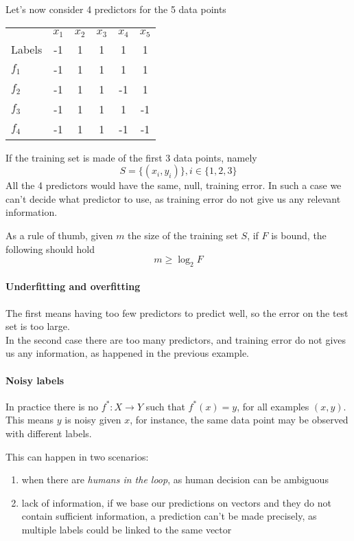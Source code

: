 Let's now consider 4 predictors for the 5 data points
\begin{center}
    \begin{tabular}{l c c c c c}
     & $x_1$ & $x_2$ & $x_3$ & $x_4$ & $x_5$ \\
     Labels & -1 & 1 & 1 & 1 & 1\\
     \hline
    $f_1$ & -1 & 1 & 1 & 1 & 1 \\
    $f_2$ & -1 & 1 & 1 & -1 & 1 \\
    $f_3$ & -1 & 1 & 1 & 1 & -1 \\
    $f_4$ & -1 & 1 & 1 & -1 & -1 \\
    \end{tabular}
\end{center}
If the training set is made of the first 3 data points, namely 
$$S = \{(x_i, y_i)\}, i \in \{1,2,3\}$$
All the 4 predictors would have the same, null, training error.
In such a case we can't decide what predictor to use, as training error do not give 
us any relevant information.

As a rule of thumb, given $m$ the size of the training set $S$, if $F$ is bound, 
the following should hold
$$m \geq \log_2 F$$

\paragraph{Underfitting and overfitting} 
The first means having too few predictors to predict well, 
so the error on the test set is too large.\\
In the second case there are too many predictors, and training error do 
not gives us any information, as happened in the previous example. 

\paragraph{Noisy labels}
In practice there is no $f^* : X \rightarrow Y$ such that $f^*(x) = y$, 
for all examples $(x,y)$. This means $y$ is noisy given $x$, for instance, 
the same data point may be observed with different labels.

This can happen in two scenarios:
\begin{enumerate}
    \item when there are \emph{humans in the loop}, as human decision 
    can be ambiguous
    \item lack of information, if we base our predictions on vectors and 
    they do not contain sufficient information, a prediction can't be made 
    precisely, as multiple labels could be linked to the same vector
\end{enumerate}

